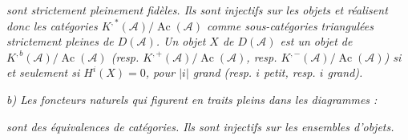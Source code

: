\clearpage
{}%
\begingroup\small\setlength{\parskip}{0pt}\setlength{\emergencystretch}{1.5em}
\setlength{\abovedisplayskip}{4pt plus 2pt minus 2pt}%
\setlength{\belowdisplayskip}{4pt plus 2pt minus 2pt}%

\noindent\textit{sont strictement pleinement fidèles. Ils sont injectifs sur les
objets et réalisent donc les catégories $K^{,*}(\mathcal A)/\operatorname{Ac}(\mathcal A)$
comme sous-catégories triangulées strictement pleines de $D(\mathcal A)$. Un
objet $X$ de $D(\mathcal A)$ est un objet de
$K^{,b}(\mathcal A)/\operatorname{Ac}(\mathcal A)$ (resp.
$K^{,+}(\mathcal A)/\operatorname{Ac}(\mathcal A)$, resp.
$K^{,-}(\mathcal A)/\operatorname{Ac}(\mathcal A)$) si et seulement si
$H^i(X)=0$, pour $|i|$ grand (resp. $i$ petit, resp. $i$ grand).}

\noindent\textit{b) Les foncteurs naturels qui figurent en traits pleins dans les
diagrammes :}
\begin{center}

\medskip
{}
\end{center}
\noindent\textit{sont des équivalences de catégories. Ils sont injectifs sur les
ensembles d'objets.}

